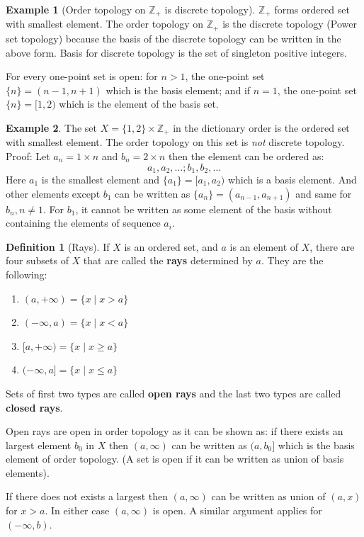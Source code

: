 \documentclass[12pt,reqno]{amsart}
\theoremstyle{plain}
\theoremstyle{definition}
\newtheorem{defn}{Definition}
\newtheorem{eg}{Example}
\newcommand{\bb}[1]{\mathbb{#1}}
\begin{document}
\begin{eg}[Order topology on $\bb Z_+$ is discrete topology]
    $\bb Z_+$ forms ordered set with smallest element. The order topology on $\bb Z_+$ is the discrete topology (Power set topology) because the basis of the discrete topology can be written in the above form. Basis for discrete topology is the set of singleton positive integers. 
    
    \noindent For every one-point set is open: for $n > 1$, the one-point set $\{n\} = (n-1, n+1)$ which is the basis element; and if $n=1$, the one-point set $\{n\} = [1,2)$ which is the element of the basis set.
\end{eg}
\begin{eg}
    The set $X = \{1,2\} \times \bb Z_+$ in the dictionary order is the ordered set with smallest element. The order topology on this set is {\it not } discrete topology. Proof: Let $a_n = 1 \times n$ and $b_n = 2 \times n$ then the element can be ordered as: 
    $$ a_1, a_2, \dots ;b_1, b_2, \dots$$
    Here $a_1$ is the smallest element and $ \{a_1\} = [a_1, a_2)$ which is a basis element. And other elements except $b_1$ can be written as $\{a_n\} = (a_{n-1}, a_{n+1})$ and same for $b_n, n \neq 1$. For $b_1$, it cannot be written as some element of the basis without containing the elements of sequence $a_i$.    
\end{eg}
\begin{defn}[Rays]
    If $X$ is an ordered set, and $a$ is an element of $X$, there are four subsets of $X$ that are called the {\bf rays} determined by $a$. They are the following:
    \begin{enumerate}
        \item $(a, +\infty) = \{x \mid x > a\}$
        \item $(-\infty, a) = \{x \mid x < a\}$
        \item $[a, +\infty) = \{x \mid x \geq a\}$
        \item $(-\infty, a] = \{x \mid x \leq a\}$
    \end{enumerate}
    Sets of first two types are called {\bf open rays} and the last two types are called {\bf closed rays}.
\end{defn}
Open rays are open in order topology as it can be shown as: if there exists an largest element $b_0$ in $X$ then $(a, \infty)$ can be written as $(a,b_0]$ which is the basis element of order topology. (A set is open if it can be written as union of basis elements).

If there does not exists a largest then $(a, \infty)$ can be written as union of $(a, x)$ for $x > a$. In either case $(a,\infty)$ is open. A similar argument applies for $(-\infty, b)$.
\end{document}
